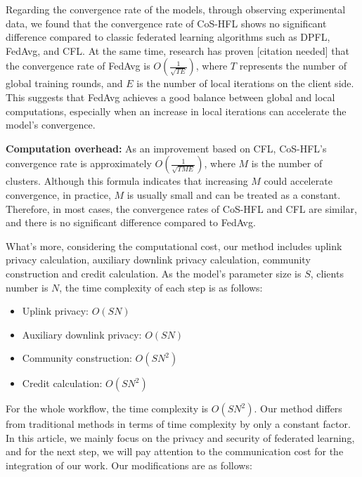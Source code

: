 \documentclass[a4paper,twoside,11pt,dvipsnames]{reviewresponse}
\begin{document}
Regarding the convergence rate of the models, through observing experimental data, we found that the convergence rate of CoS-HFL shows no significant difference compared to classic federated learning algorithms such as DPFL, FedAvg, and CFL. At the same time, research has proven [citation needed] that the convergence rate of FedAvg is $O(\frac{1}{\sqrt{TE}})$\cite{CoRR}, where $T$ represents the number of global training rounds, and $E$ is the number of local iterations on the client side. This suggests that FedAvg achieves a good balance between global and local computations, especially when an increase in local iterations can accelerate the model’s convergence.


\textbf{Computation overhead:}
As an improvement based on CFL, CoS-HFL’s convergence rate is approximately $O(\frac{1}{\sqrt{TME}})$\cite{9377960}, where $M$ is the number of clusters. Although this formula indicates that increasing $M$ could accelerate convergence, in practice, $M$ is usually small and can be treated as a constant. Therefore, in most cases, the convergence rates of CoS-HFL and CFL are similar, and there is no significant difference compared to FedAvg.

What's more, considering the computational cost, our method includes uplink privacy calculation, auxiliary downlink privacy calculation, community construction and credit calculation.
As the model's parameter size is $S$, clients number is $N$, the time complexity of each step is as follows:
\begin{itemize}
    \item Uplink privacy: $O(SN)$
    \item Auxiliary downlink privacy: $O(SN)$
    \item Community construction: $O(SN^2)$
    \item Credit calculation: $O(SN^2)$
\end{itemize}



For the whole workflow, the time complexity is $O(SN^2)$. Our method differs from traditional methods\cite{9377960} in terms of time complexity by only a constant factor.
In this article, we mainly focus on the privacy and security of federated learning, and for the next step, we will pay attention to the communication cost for the integration of our work. Our modifications are as follows:
\end{document}
